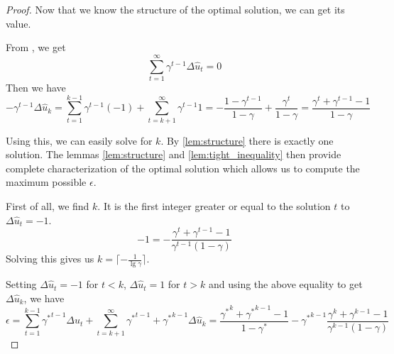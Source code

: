 \begin{proof}
Now that we know the structure of the optimal solution, we can get its value.

From , we get
\[
\sum_{t=1}^\infty \gamma^{t-1} \Delta \hat{u}_t = 0
\]
Then we have
\begin{equation} \label{eq:what_is_delta}
- \gamma^{t-1} \Delta \hat{u}_k = \sum_{t=1}^{k-1} \gamma^{t-1} (-1) + \sum_{t=k+1}^{\infty} \gamma^{t-1} 1 = -\frac{1-\gamma^{t-1}}{1-\gamma} + \frac{\gamma^{t}}{1-\gamma} = \frac{\gamma^{t} + \gamma^{t-1} - 1}{1-\gamma}
\end{equation}

Using this, we can easily solve for $k$. By \cref{lem:structure} there is exactly one solution. The lemmas \ref{lem:structure} and \ref{lem:tight_inequality} then provide complete characterization of the optimal solution which allows us to compute the maximum possible $\epsilon$.

First of all, we find $k$. It is the first integer greater or equal to the solution $t$ to $\Delta \hat{u}_t = -1$.
\[
-1 = -\frac{\gamma^{t} + \gamma^{t-1} - 1}{\gamma^{t-1} (1-\gamma)}
\]
Solving this gives us $k = \lceil-\frac{1}{\lg \gamma}\rceil$.

Setting $\Delta \hat{u}_t = -1$ for $t < k$, $\Delta \hat{u}_t = 1$ for $t > k$ and using the above equality to get $\Delta \hat{u}_k$, we have
\[
\epsilon = \sum_{t=1}^{k-1} {\gamma^*}^{t-1} \Delta \hat{u}_t + \sum_{t=k+1}^{\infty} {\gamma^*}^{t-1} + {\gamma^*}^{k-1} \Delta \hat{u}_k = \frac{{\gamma^*}^{k} + {\gamma^*}^{k-1} - 1}{1-\gamma^*} - {\gamma^*}^{k-1}\frac{\gamma^{k} + \gamma^{k-1} - 1}{\gamma^{k-1}(1-\gamma)}
\]
\end{proof}
